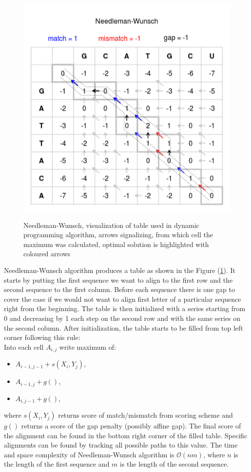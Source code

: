 \begin{figure}[ht]
  \centering
	\includegraphics[width=\textwidth]{./images/needle_wunsch.png}
	\cite{needleman}
  \caption[Needleman-Wunsch]{Needleman-Wunsch, visualization of table used in dynamic programming algorithm, arrows signalizing, from which cell the maximum was calculated, optimal solution is highlighted with coloured arrows}
  \label{fig:glal}
\end{figure}

Needleman-Wunsch algorithm produces a table as shown in the Figure (\ref{fig:glal}).
It starts by putting the first sequence we want to align to the first row and the second sequence to the first column.
Before each sequence there is one gap to cover the case if we would not want to align first letter of a particular sequence right from the beginning.
The table is then initialized with a series starting from 0 and decreasing by 1 each step on the second row and with the same series on the second column.
After initialization, the table starts to be filled from top left corner following this rule:\\
Into each cell $A_{i,j}$ write maximum of:
\begin{itemize}
\item $A_{i-1, j-1} + s(X_i, Y_j)$,
\item $A_{i-1, j} + g()$,
\item $A_{i, j-1} + g()$,
\end{itemize}
where $s(X_i, Y_j)$ returns score of match/mismatch from scoring scheme and $g()$ returns a score of the gap penalty (possibly affine gap).
The final score of the alignment can be found in the bottom right corner of the filled table.
Specific alignments can be found by tracking all possible paths to this value.
The time and space complexity of Needleman-Wunsch algorithm is $\mathcal{O}(nm)$, where $n$ is the length of the first sequence and $m$ is the length of the second sequence.

